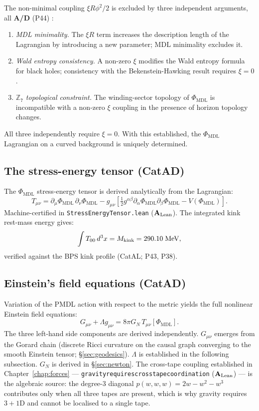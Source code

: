 \documentclass[11pt,openany]{book}
\theoremstyle{remark}
\newcommand{\PHIMDL}{\Phi_{\mathrm{MDL}}}
\newcommand{\ZS}{\mathbb{Z}_7}
\newcommand{\lean}[1]{%
  \penalty-100
  \begingroup\def\_{\textunderscore\allowbreak}\texttt{#1}\endgroup}
\newcommand{\GN}{G_N}
\newcommand{\CMCA}{\text{CMCA}}
\newcommand{\CatAL}{\ensuremath{\textbf{A}_{\rm Lean}}}
\newcommand{\CatAD}{\textbf{A/D}}
\begin{document}
The non-minimal coupling $\xi R\phi^2/2$ is excluded by three independent arguments,
all \CatAD{} (P44) \cite{SpivackQGR}:
\begin{enumerate}
\item \textit{MDL minimality.} The $\xi R$ term increases the description length of
  the Lagrangian by introducing a new parameter; MDL minimality excludes it.
\item \textit{Wald entropy consistency.} A non-zero $\xi$ modifies the Wald entropy
  formula for black holes; consistency with the Bekenstein-Hawking result requires
  $\xi = 0$.
\item \textit{$\ZS$ topological constraint.} The winding-sector topology of $\PHIMDL$
  is incompatible with a non-zero $\xi$ coupling in the presence of horizon topology
  changes.
\end{enumerate}
All three independently require $\xi = 0$.
With this established, the $\PHIMDL$ Lagrangian on a curved background is uniquely
determined.

\subsection*{The stress-energy tensor (CatAD)}

The $\PHIMDL$ stress-energy tensor is derived analytically from the Lagrangian:
\begin{equation}
  T_{\mu\nu} = \partial_\mu\PHIMDL\,\partial_\nu\PHIMDL
               - g_{\mu\nu}\!\left[\tfrac{1}{2}g^{\alpha\beta}\partial_\alpha\PHIMDL\partial_\beta\PHIMDL
               - V(\PHIMDL)\right].
  \label{eq:tmunu}
\end{equation}
Machine-certified in \lean{StressEnergyTensor.lean} (\CatAL).
The integrated kink rest-mass energy gives:
\begin{equation}
  \int T_{00}\,d^3x = M_{\rm kink} = 290.10\;\text{MeV},
  \label{eq:kink_mass_integral}
\end{equation}
verified against the BPS kink profile (CatAL; P43, P38).

\subsection*{Einstein's field equations (CatAD)}

Variation of the PMDL action with respect to the metric yields the full nonlinear
Einstein field equations:
\begin{equation}
  G_{\mu\nu} + \Lambda g_{\mu\nu} = 8\pi \GN\,T_{\mu\nu}[\PHIMDL].
  \label{eq:EFE}
\end{equation}
The three left-hand side components are derived independently.
$G_{\mu\nu}$ emerges from the Gorard chain (discrete Ricci curvature on the \CMCA{}
causal graph converging to the smooth Einstein tensor; \S\ref{sec:geodesics}).
$\Lambda$ is established in the following subsection.
$\GN$ is derived in \S\ref{sec:newton}.
The cross-tape coupling established in Chapter~\ref{chap:forces} ---
\lean{gravity\_requires\_cross\_tape\_coordination} (\CatAL) --- is the algebraic
source: the degree-3 diagonal $p(w,w,w) = 2w - w^2 - w^3$ contributes only when
all three tapes are present, which is why gravity requires $3{+}1$D and cannot be
localised to a single tape.
\end{document}
